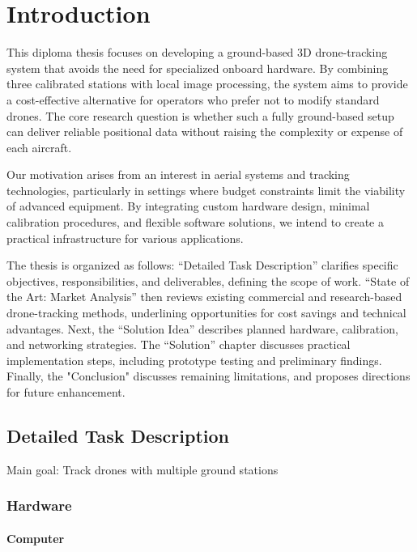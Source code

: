 \chapter{Introduction}

This diploma thesis focuses on developing a ground-based 3D drone-tracking system that avoids the need for specialized onboard hardware. By combining three calibrated stations with local image processing, the system aims to provide a cost-effective alternative for operators who prefer not to modify standard drones. The core research question is whether such a fully ground-based setup can deliver reliable positional data without raising the complexity or expense of each aircraft.

Our motivation arises from an interest in aerial systems and tracking technologies, particularly in settings where budget constraints limit the viability of advanced equipment. By integrating custom hardware design, minimal calibration procedures, and flexible software solutions, we intend to create a practical infrastructure for various applications.

The thesis is organized as follows: “Detailed Task Description” clarifies specific objectives, responsibilities, and deliverables, defining the scope of work. “State of the Art: Market Analysis” then reviews existing commercial and research-based drone-tracking methods, underlining opportunities for cost savings and technical advantages. Next, the “Solution Idea” describes planned hardware, calibration, and networking strategies. The “Solution” chapter discusses practical implementation steps, including prototype testing and preliminary findings. Finally, the "Conclusion" discusses remaining limitations, and proposes directions for future enhancement.

\section{Detailed Task Description}

Main goal: Track drones with multiple ground stations

\subsection{Hardware}

\subsubsection{Computer}

